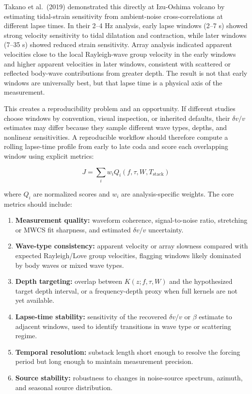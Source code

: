 \documentclass[draft]{agujournal2019}
\providecommand{\tightlist}{%
  \setlength{\itemsep}{0pt}\setlength{\parskip}{0pt}}
\begin{document}
Takano et al.~(2019) demonstrated this directly at Izu-Oshima volcano by
estimating tidal-strain sensitivity from ambient-noise
cross-correlations at different lapse times. In their 2--4 Hz analysis,
early lapse windows (2--7 s) showed strong velocity sensitivity to tidal
dilatation and contraction, while later windows (7--35 s) showed reduced
strain sensitivity. Array analysis indicated apparent velocities close
to the local Rayleigh-wave group velocity in the early windows and
higher apparent velocities in later windows, consistent with scattered
or reflected body-wave contributions from greater depth. The result is
not that early windows are universally best, but that lapse time is a
physical axis of the measurement.

This creates a reproducibility problem and an opportunity. If different
studies choose windows by convention, visual inspection, or inherited
defaults, their \(\delta v/v\) estimates may differ because they sample
different wave types, depths, and nonlinear sensitivities. A
reproducible workflow should therefore compute a rolling lapse-time
profile from early to late coda and score each overlapping window using
explicit metrics:

\[J = \sum_i w_i Q_i(f,\tau,W,T_{\mathrm{stack}}) \tag{16}\]

where \(Q_i\) are normalized scores and \(w_i\) are analysis-specific
weights. The core metrics should include:

\begin{enumerate}
\def\labelenumi{\arabic{enumi}.}
\tightlist
\item
  \textbf{Measurement quality:} waveform coherence, signal-to-noise
  ratio, stretching or MWCS fit sharpness, and estimated \(\delta v/v\)
  uncertainty.
\item
  \textbf{Wave-type consistency:} apparent velocity or array slowness
  compared with expected Rayleigh/Love group velocities, flagging
  windows likely dominated by body waves or mixed wave types.
\item
  \textbf{Depth targeting:} overlap between \(K(z; f,\tau,W)\) and the
  hypothesized target depth interval, or a frequency-depth proxy when
  full kernels are not yet available.
\item
  \textbf{Lapse-time stability:} sensitivity of the recovered
  \(\delta v/v\) or \(\beta\) estimate to adjacent windows, used to
  identify transitions in wave type or scattering regime.
\item
  \textbf{Temporal resolution:} substack length short enough to resolve
  the forcing period but long enough to maintain measurement precision.
\item
  \textbf{Source stability:} robustness to changes in noise-source
  spectrum, azimuth, and seasonal source distribution.
\end{enumerate}
\end{document}
